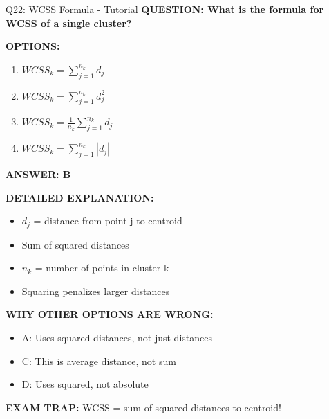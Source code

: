 \documentclass[8pt]{beamer}
\begin{document}
	\begin{frame}{Q22: WCSS Formula - Tutorial}
		\fontsize{6.5}{7.5}\selectfont
		\textbf{QUESTION: What is the formula for WCSS of a single cluster?}
		
		\vspace{0.1cm}
		\textbf{OPTIONS:}
		\begin{enumerate}
			\item $WCSS_k = \sum_{j=1}^{n_k} d_j$
			\item $WCSS_k = \sum_{j=1}^{n_k} d_j^2$
			\item $WCSS_k = \frac{1}{n_k} \sum_{j=1}^{n_k} d_j$
			\item $WCSS_k = \sum_{j=1}^{n_k} |d_j|$
		\end{enumerate}
		
		\vspace{0.1cm}
		\textcolor{myblue}{\textbf{ANSWER: B}}
		
		\vspace{0.1cm}
		\textbf{DETAILED EXPLANATION:}
		\begin{itemize}
			\item $d_j$ = distance from point j to centroid
			\item Sum of squared distances
			\item $n_k$ = number of points in cluster k
			\item Squaring penalizes larger distances
		\end{itemize}
		
		\vspace{0.1cm}
		\textcolor{myred}{\textbf{WHY OTHER OPTIONS ARE WRONG:}}
		\begin{itemize}
			\item \textcolor{myred}{A:} Uses squared distances, not just distances
			\item \textcolor{myred}{C:} This is average distance, not sum
			\item \textcolor{myred}{D:} Uses squared, not absolute
		\end{itemize}
		
		\textcolor{myred}{\textbf{EXAM TRAP:}} WCSS = \textcolor{myblue}{sum of squared distances} to centroid!
	\end{frame}
	
\end{document}
